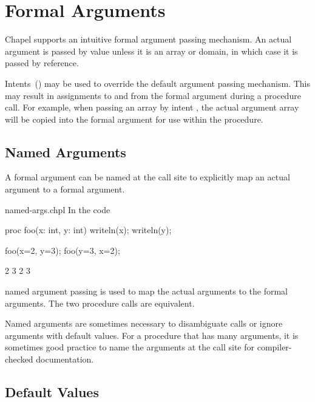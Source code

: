 \section{Formal Arguments}
\label{Formal_Arguments}

Chapel supports an intuitive formal argument passing mechanism.  An
actual argument is passed by value unless it is an array or domain, in
which case it is passed by reference.

Intents~() may be used to override the default
argument passing mechanism.  This may result in assignments to and from
the formal argument during a procedure call.  For example, when passing an array by
intent , the actual argument array will be copied into the formal argument
for use within the procedure.

\subsection{Named Arguments}
\label{Named_Arguments}

A formal argument can be named at the call site to explicitly map an
actual argument to a formal argument.

\begin{chapelexample}{named-args.chpl}
In the code
\begin{chapel}
proc foo(x: int, y: int) { writeln(x); writeln(y); }

foo(x=2, y=3);
foo(y=3, x=2);
\end{chapel}
\begin{chapeloutput}
2
3
2
3
\end{chapeloutput}
named argument passing is used to map the actual arguments to the
formal arguments.  The two procedure calls are equivalent.
\end{chapelexample}

Named arguments are sometimes necessary to disambiguate calls or
ignore arguments with default values.  For a procedure that has many
arguments, it is sometimes good practice to name the arguments at the
call site for compiler-checked documentation.

\subsection{Default Values}
\label{Default_Values}

